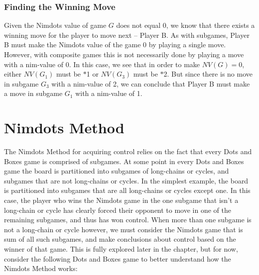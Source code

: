 \documentclass[12pt,twoside]{reedthesis}
\begin{document}
\subsubsection{Finding the Winning Move}
Given the Nimdots value of game $G$ does not equal 0, we know that there exists a winning move for the player to move next -- Player B.  As with subgames, Player B must make the Nimdots value of the game 0 by playing a single move.  However, with composite games this is not necessarily done by playing a move with a nim-value of 0.  In this case, we see that in order to make $NV(G) = 0$, either $NV(G_1)$ must be $\ast$1 or $NV(G_3)$ must be $\ast$2.  But since there is no move in subgame $G_3$ with a nim-value of 2, we can conclude that Player B must make a move in subgame $G_1$ with a nim-value of 1.  


\section{Nimdots Method}
The Nimdots Method for acquiring control relies on the fact that every Dots and Boxes game is comprised of subgames.  At some point in every Dots and Boxes game the board is partitioned into subgames of long-chains or cycles, and subgames that are not long-chains or cycles.  In the simplest example, the board is partitioned into subgames that are all long-chains or cycles except one.  In this case, the player who wins the Nimdots game in the one subgame that isn't a long-chain or cycle has clearly forced their opponent to move in one of the remaining subgames, and thus has won control.  When more than one subgame is not a long-chain or cycle however, we must consider the Nimdots game that is sum of all such subgames, and make conclusions about control based on the winner of that game.  This is fully explored later in the chapter, but for now, consider the following Dots and Boxes game to better understand how the Nimdots Method works:
\end{document}
